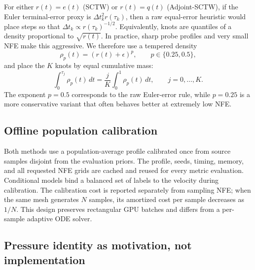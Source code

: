 For either $r(t)=e(t)$ (SCTW) or $r(t)=q(t)$ (Adjoint-SCTW), if the Euler terminal-error proxy is
$\Delta t_k^2 r(\tau_k)$, then a raw equal-error heuristic would
place steps so that $\Delta t_k \propto r(\tau_k)^{-1/2}$. Equivalently, knots are quantiles of a
density proportional to $\sqrt{r(t)}$. In practice, sharp probe profiles and very small NFE make
this aggressive. We therefore use a tempered density
\begin{equation}
  \rho_p(t) = \left(r(t)+\epsilon\right)^p,
  \qquad p \in \{0.25,0.5\},
  \label{eq:mesh-density}
\end{equation}
and place the $K$ knots by equal cumulative mass:
\begin{equation}
  \int_0^{\tau_j} \rho_p(t)\,dt
  =
  \frac{j}{K}
  \int_0^1 \rho_p(t)\,dt,
  \qquad j=0,\ldots,K.
  \label{eq:equidistribution}
\end{equation}
The exponent $p=0.5$ corresponds to the raw Euler-error rule, while $p=0.25$ is a more conservative
variant that often behaves better at extremely low NFE.

\subsection{Offline population calibration}
\label{sec:offline-calibration}

Both methods use a population-average profile calibrated once from source samples disjoint from
the evaluation priors. The profile, seeds, timing, memory, and all requested NFE grids are cached
and reused for every metric evaluation. Conditional models bind a balanced set of labels to the
velocity during calibration. The calibration cost is reported separately from sampling NFE; when
the same mesh generates $N$ samples, its amortized cost per sample decreases as $1/N$. This design
preserves rectangular GPU batches and differs from a per-sample adaptive ODE solver.

\subsection{Pressure identity as motivation, not implementation}
\label{sec:pressure-identity}

